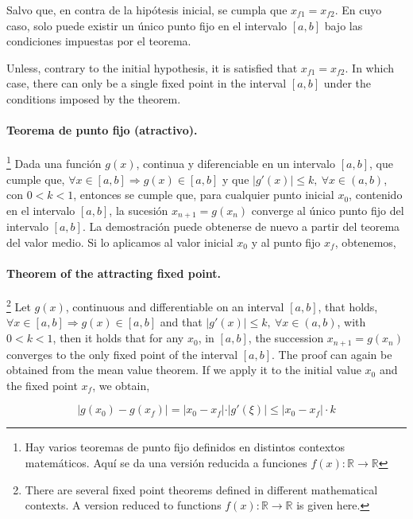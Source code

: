\begin{paracol}{2}
Salvo que, en contra de la hipótesis inicial, se cumpla que  $ x_{f1}=x_{f2}$. En cuyo caso, solo puede existir un único punto fijo en el intervalo $[a, b]$ bajo las condiciones impuestas por el teorema.

\switchcolumn
Unless, contrary to the initial hypothesis, it is satisfied that $ x_{f1}=x_{f2}$. In which case, there can only be a single fixed point in the interval $[a, b]$ under the conditions imposed by the theorem.

\paragraph{Teorema de punto fijo (atractivo).}\footnote{Hay varios teoremas de punto fijo definidos en distintos contextos matemáticos. Aquí se da una versión reducida a funciones $f(x):\mathbb{R} \rightarrow \mathbb{R}$} Dada una función $g(x)$,  continua y diferenciable en un intervalo $[a, b]$, que  cumple que, $\forall x \in [a, b] \Rightarrow g(x)\in [a,b]$ y que  $\vert g'(x) \vert \leq k, \  \forall x \in (a, b)$, con $0<k<1$, entonces se cumple que, para cualquier punto inicial $x_0$, contenido en el intervalo $[a, b]$, la sucesión  $x_{n+1}=g(x_n)$ converge al único punto fijo del intervalo $[a, b]$.
La demostración puede obtenerse de nuevo a partir del teorema del valor medio. Si lo aplicamos al valor inicial $x_0$ y al punto fijo $x_f$, obtenemos,
\switchcolumn

\paragraph{Theorem of the attracting fixed point.} \footnote{There are several fixed point theorems defined in different mathematical contexts. A version reduced to functions $f(x):\mathbb{R} \rightarrow \mathbb{R}$ is given here.} Let $g(x)$,  continuous and differentiable on an interval $[a, b]$, that holds, $\forall x \in [a, b] \Rightarrow g(x)\in [a,b]$ and that  $\vert g'(x) \vert \leq k, \  \forall x \in (a, b)$, with $0<k<1$, then it holds that for any $x_0$, in $[a, b]$, the succession  $x_{n+1}=g(x_n)$ converges to the only fixed point of the interval $[a, b]$.
The proof can again be obtained from the mean value theorem. If we apply it to the initial value $x_0$ and the fixed point $x_f$, we obtain,

\end{paracol}


\begin{equation*}
\vert g(x_0)-g(x_f) \vert =\vert x_0-x_f \vert \cdot \vert g'(\xi) \vert \leq \vert x_0-x_f \vert \cdot k 
\end{equation*}


